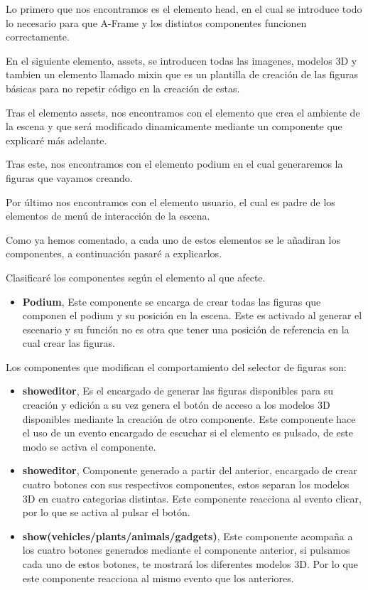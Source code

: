 \documentclass[a4paper, 12pt]{book}
\begin{document}
Lo primero que nos encontramos es el elemento head, en el cual  se introduce todo lo necesario para que A-Frame y los distintos componentes funcionen correctamente.

En el siguiente elemento, assets, se introducen todas las imagenes, modelos 3D y tambien un elemento llamado mixin que es un plantilla de creación de las figuras básicas para no repetir código en la creación de estas.

Tras el elemento assets, nos encontramos con el elemento que crea el ambiente de la escena y que será modificado dinamicamente mediante un componente que explicaré más adelante.

Tras este, nos encontramos con el elemento podium en el cual generaremos la figuras que vayamos creando.

Por último nos encontramos con el elemento usuario, el cual es padre de los elementos de menú de interacción de la escena.

Como ya hemos comentado, a cada uno de estos elementos se le añadiran los componentes, a continuación pasaré a explicarlos.

Clasificaré los componentes según el elemento al que afecte.

\begin{itemize}
    \item \textbf{Podium}, Este componente se encarga de crear todas las figuras que componen el podium y su posición en la escena. Este es activado al generar el escenario y su función no es otra que tener una posición de referencia en la cual crear las figuras.
\end{itemize}

Los componentes que modifican el comportamiento del selector de figuras son:
\begin{itemize}
    \item \textbf{showeditor}, Es el encargado de generar las figuras disponibles para su creación y edición a su vez genera el botón de acceso a los modelos 3D disponibles mediante la creación de otro componente. Este componente hace el uso de un evento encargado de escuchar si el elemento es pulsado, de este modo se activa el componente.
    
    \item \textbf{showeditor}, Componente generado a partir del anterior, encargado de crear cuatro botones con sus respectivos componentes, estos separan los modelos 3D en cuatro categorias distintas. Este componente reacciona al evento clicar, por lo que se activa al pulsar el botón.

    \item \textbf{show(vehicles/plants/animals/gadgets)}, Este componente acompaña a los cuatro botones generados mediante el componente anterior, si pulsamos cada uno de estos botones, te mostrará los diferentes modelos 3D. Por lo que este componente reacciona al mismo evento que los anteriores.

\end{itemize}
\end{document}

